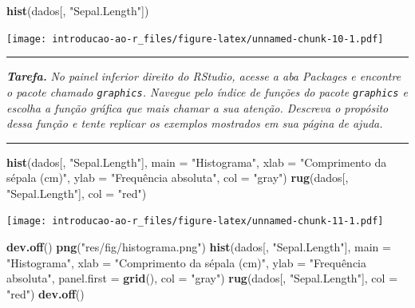 \documentclass[
]{book}
\newenvironment{Shaded}{\begin{snugshade}}{\end{snugshade}}
\newcommand{\DataTypeTok}[1]{\textcolor[rgb]{0.13,0.29,0.53}{#1}}
\newcommand{\KeywordTok}[1]{\textcolor[rgb]{0.13,0.29,0.53}{\textbf{#1}}}
\newcommand{\NormalTok}[1]{#1}
\newcommand{\StringTok}[1]{\textcolor[rgb]{0.31,0.60,0.02}{#1}}
\begin{document}
\begin{Shaded}
\begin{Highlighting}[]
\KeywordTok{hist}\NormalTok{(dados[, }\StringTok{"Sepal.Length"}\NormalTok{])}
\end{Highlighting}
\end{Shaded}

\texttt{[image: introducao-ao-r\_files/figure-latex/unnamed-chunk-10-1.pdf]}

\begin{center}\rule{0.5\linewidth}{0.5pt}\end{center}

\textbf{\emph{Tarefa.}} \emph{No painel inferior direito do RStudio, acesse a aba \emph{Packages} e encontre o pacote chamado \texttt{graphics}. Navegue pelo índice de funções do pacote \texttt{graphics} e escolha a função gráfica que mais chamar a sua atenção. Descreva o propósito dessa função e tente replicar os exemplos mostrados em sua página de ajuda.}

\begin{center}\rule{0.5\linewidth}{0.5pt}\end{center}

\begin{Shaded}
\begin{Highlighting}[]
\KeywordTok{hist}\NormalTok{(dados[, }\StringTok{"Sepal.Length"}\NormalTok{],}
     \DataTypeTok{main =} \StringTok{"Histograma"}\NormalTok{,}
     \DataTypeTok{xlab =} \StringTok{"Comprimento da sépala (cm)"}\NormalTok{,}
     \DataTypeTok{ylab =} \StringTok{"Frequência absoluta"}\NormalTok{,}
     \DataTypeTok{col =} \StringTok{"gray"}\NormalTok{)}
\KeywordTok{rug}\NormalTok{(dados[, }\StringTok{"Sepal.Length"}\NormalTok{], }\DataTypeTok{col =} \StringTok{"red"}\NormalTok{)}
\end{Highlighting}
\end{Shaded}

\texttt{[image: introducao-ao-r\_files/figure-latex/unnamed-chunk-11-1.pdf]}

\begin{Shaded}
\begin{Highlighting}[]
\KeywordTok{dev.off}\NormalTok{()}
\KeywordTok{png}\NormalTok{(}\StringTok{"res/fig/histograma.png"}\NormalTok{)}
\KeywordTok{hist}\NormalTok{(dados[, }\StringTok{"Sepal.Length"}\NormalTok{],}
     \DataTypeTok{main =} \StringTok{"Histograma"}\NormalTok{,}
     \DataTypeTok{xlab =} \StringTok{"Comprimento da sépala (cm)"}\NormalTok{,}
     \DataTypeTok{ylab =} \StringTok{"Frequência absoluta"}\NormalTok{,}
     \DataTypeTok{panel.first =} \KeywordTok{grid}\NormalTok{(),}
     \DataTypeTok{col =} \StringTok{"gray"}\NormalTok{)}
\KeywordTok{rug}\NormalTok{(dados[, }\StringTok{"Sepal.Length"}\NormalTok{], }\DataTypeTok{col =} \StringTok{"red"}\NormalTok{)}
\KeywordTok{dev.off}\NormalTok{()}
\end{Highlighting}
\end{Shaded}
\end{document}
